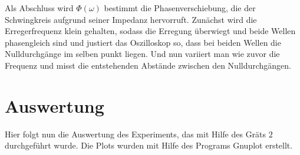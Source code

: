 \documentclass{scrartcl}
\begin{document}
     Als Abschluss wird $\Phi(\omega)$ bestimmt die Phasenverschiebung, die der Schwingkreis aufgrund seiner Impedanz hervorruft.
     Zunächst wird die Erregerfrequenz klein gehalten, sodass die Erregung überwiegt und beide Wellen phasengleich sind
     und justiert das Oszilloskop so, dass bei beiden Wellen die Nulldurchgänge im selben punkt liegen.
     Und nun variiert man wie zuvor die Frequenz und misst die entstehenden Abstände zwischen den Nulldurchgängen.

     \section{Auswertung}
     \label{sec:Auswertung}
     Hier folgt nun die Auswertung des Experiments, das mit Hilfe des Gräts $2$ durchgeführt wurde.
     Die Plots wurden mit Hilfe des Programs Gnuplot erstellt.
\end{document}
